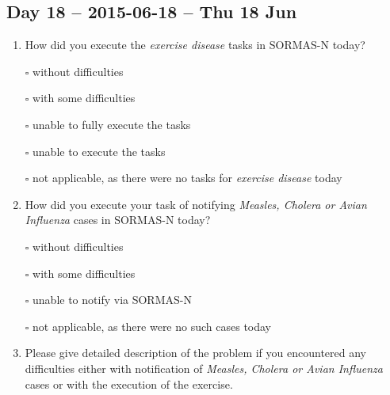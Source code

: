 \documentclass[a4paper, titlepage]{tufte-handout}
\begin{document}
\subsection{Day 18 -- 2015-06-18 -- Thu 18 Jun}
\label{sec-8-14}
\begin{enumerate}
\item How did you execute the \emph{exercise disease} tasks in SORMAS-N today?

\quad $\square$ without difficulties

\quad $\square$ with some difficulties

\quad $\square$ unable to fully execute the tasks

\quad $\square$ unable to execute the tasks

\quad $\square$ not applicable, as there were no tasks for \emph{exercise disease} today

\item How did you execute your task of notifying \emph{Measles, Cholera or Avian Influenza} cases in SORMAS-N today?

\quad $\square$ without difficulties

\quad $\square$ with some difficulties

\quad $\square$ unable to notify via SORMAS-N

\quad $\square$ not applicable, as there were no such cases today

\item Please give detailed description of the problem if you encountered any difficulties either with notification of \emph{Measles, Cholera or Avian Influenza} cases or with the execution of the exercise.

\hrulefill

\hrulefill

\hrulefill

\hrulefill

\hrulefill

\hrulefill

\hrulefill

\hrulefill

\hrulefill

\hrulefill
\end{enumerate}

\newpage
\end{document}
